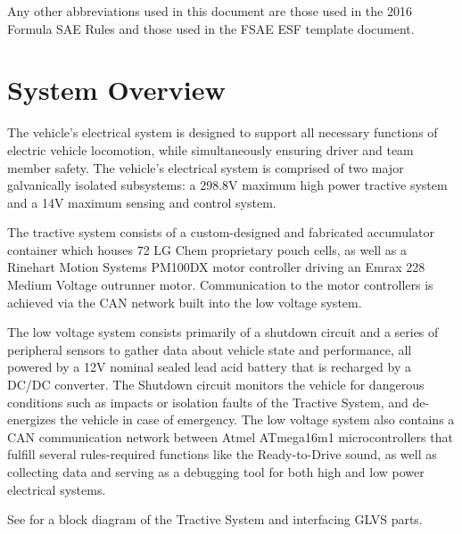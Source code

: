 \documentclass{article}
\begin{document}
    Any other abbreviations used in this document are those used in the 2016 Formula SAE Rules and those used in the FSAE ESF template document.

\setlength{\parindent}{0pt}

\newpage
{}
\section{System Overview}\label{system_overview}
The vehicle's electrical system is designed to support all necessary functions of electric vehicle locomotion, while simultaneously ensuring driver and team member safety. The vehicle's electrical system is comprised of two major galvanically isolated subsystems: a 298.8V maximum high power tractive system and a 14V maximum sensing and control system.

The tractive system consists of a custom-designed and fabricated accumulator container which houses 72 LG Chem proprietary pouch cells, as well as a Rinehart Motion Systems PM100DX motor controller driving an Emrax 228 Medium Voltage outrunner motor. Communication to the motor controllers is achieved via the CAN network built into the low voltage system.

The low voltage system consists primarily of a shutdown circuit and a series of peripheral sensors to gather data about vehicle state and performance, all powered by a 12V nominal sealed lead acid battery that is recharged by a DC/DC converter. The Shutdown circuit monitors the vehicle for dangerous conditions such as impacts or isolation faults of the Tractive System, and de-energizes the vehicle in case of emergency. The low voltage system also contains a CAN communication network between Atmel ATmega16m1 microcontrollers that fulfill several rules-required functions like the Ready-to-Drive sound, as well as collecting data and serving as a debugging tool for both high and low power electrical systems.

See  for a block diagram of the Tractive System and interfacing GLVS parts.

\end{document}
